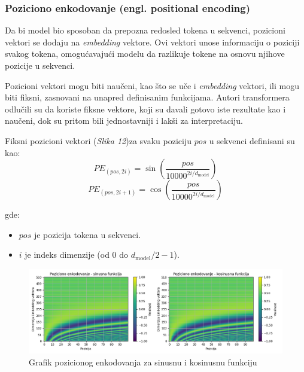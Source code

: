 \documentclass[12pt]{article}
\begin{document}
   \newpage

   \subsubsection*{Poziciono enkodovanje (engl. positional encoding)}
   Da bi model bio sposoban da prepozna redosled tokena u sekvenci, pozicioni vektori 
   se dodaju na \textit{embedding} vektore. Ovi vektori unose informaciju o poziciji 
   svakog tokena, omogućavajući modelu da razlikuje tokene na osnovu njihove pozicije 
   u sekvenci.

   Pozicioni vektori mogu biti naučeni, kao što se uče i \textit{embedding} vektori, ili mogu biti fiksni, 
   zasnovani na unapred definisanim funkcijama. Autori transformera odlučili su da 
   koriste fiksne vektore, koji su davali gotovo iste rezultate kao i naučeni, 
   dok su pritom bili jednostavniji i lakši za interpretaciju.

   Fiksni pozicioni vektori (\textit{Slika 12})za svaku poziciju \( pos \) u sekvenci definisani su kao:
   \[
      PE_{(pos, 2i)} = \sin\left(\frac{pos}{10000^{2i/d_{\text{model}}}}\right)
   \]
   \vspace{-0.5cm}
   \[
         PE_{(pos, 2i+1)} = \cos\left(\frac{pos}{10000^{2i/d_{\text{model}}}}\right)
   \]
         
   gde:
   \begin{itemize}
      \vspace{-0.5cm}
      \item \( pos \) je pozicija tokena u sekvenci.
      \item \( i \) je indeks dimenzije (od 0 do \( d_{\text{model}}/2 - 1 \)).
   \end{itemize}

   \begin{figure}[h!]
      \hspace{-2cm} %
      \includegraphics[width=1.3\textwidth]{pos_encoding.png}
      \caption{Grafik pozicionog enkodovanja za sinusnu i kosinusnu funkciju}
      \label{fig:pos_encoding}
   \end{figure}
\end{document}
